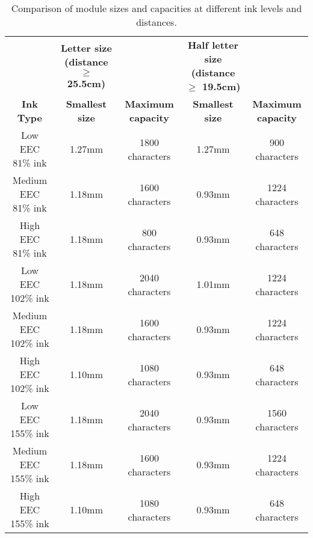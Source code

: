 \begin{table*}[h!]
\centering
\small\begin{tabular}{ccccc}
\toprule
 & \textbf{Letter size (distance $\geq$ 25.5cm)} &  & \textbf{Half letter size (distance $\geq$ 19.5cm)} & \\
\cline{2-3}\cline{4-5}
\textbf{Ink Type} & \textbf{Smallest size} & \textbf{Maximum capacity} & \textbf{Smallest size} & \textbf{Maximum capacity}\\
\midrule
Low EEC 81\% ink & 1.27mm & 1800 characters & 1.27mm & 900 characters\\
Medium EEC 81\% ink & 1.18mm & 1600 characters & 0.93mm & 1224 characters\\
High EEC 81\% ink & 1.18mm & 800 characters & 0.93mm & 648 characters\\
Low EEC 102\% ink & 1.18mm & 2040 characters & 1.01mm & 1224 characters\\
Medium EEC 102\% ink & 1.18mm & 1600 characters & 0.93mm & 1224 characters\\
High EEC 102\% ink & 1.10mm & 1080 characters & 0.93mm & 648 characters\\
Low EEC 155\% ink & 1.18mm & 2040 characters & 0.93mm & 1560 characters\\
Medium EEC 155\% ink & 1.18mm & 1600 characters & 0.93mm & 1224 characters\\
High EEC 155\% ink & 1.10mm & 1080 characters & 0.93mm & 648 characters\\
\bottomrule
\end{tabular}
\vspace{0.1cm}
\caption{Comparison of module sizes and capacities at different ink levels and distances.}
\end{table*}\label{tab:inkcomparison}







